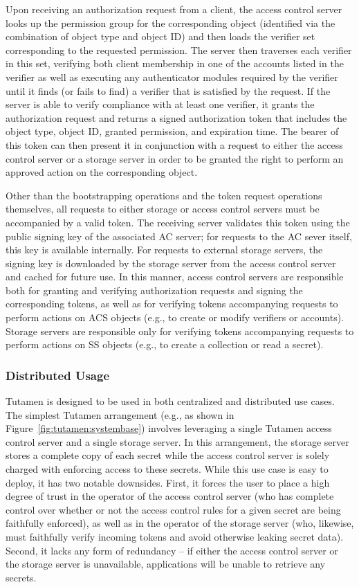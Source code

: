 Upon receiving an authorization request from a client, the access
control server looks up the permission group for the corresponding
object (identified via the combination of object type and object ID)
and then loads the verifier set corresponding to the requested
permission. The server then traverses each verifier in this set,
verifying both client membership in one of the accounts listed in the
verifier as well as executing any authenticator modules required by
the verifier until it finds (or fails to find) a verifier that is
satisfied by the request. If the server is able to verify compliance
with at least one verifier, it grants the authorization request and
returns a signed authorization token that includes the object type,
object ID, granted permission, and expiration time. The bearer of this
token can then present it in conjunction with a request to either the
access control server or a storage server in order to be granted the
right to perform an approved action on the corresponding object.

Other than the bootstrapping operations and the token request
operations themselves, all requests to either storage or access
control servers must be accompanied by a valid token. The receiving
server validates this token using the public signing key of the
associated AC server; for requests to the AC sever itself, this key is
available internally. For requests to external storage servers, the
signing key is downloaded by the storage server from the access
control server and cached for future use. In this manner, access
control servers are responsible both for granting and verifying
authorization requests and signing the corresponding tokens, as well
as for verifying tokens accompanying requests to perform actions on
ACS objects (e.g., to create or modify verifiers or accounts). Storage
servers are responsible only for verifying tokens accompanying
requests to perform actions on SS objects (e.g., to create a collection
or read a secret).

\subsubsection{Distributed Usage}
\label{sec:tutamen:arch:distributed}

Tutamen is designed to be used in both centralized and distributed use
cases. The simplest Tutamen arrangement (e.g., as shown in
Figure~\ref{fig:tutamen:systembase}) involves leveraging a single
Tutamen access control server and a single storage server. In this
arrangement, the storage server stores a complete copy of each secret
while the access control server is solely charged with enforcing
access to these secrets. While this use case is easy to deploy, it has
two notable downsides. First, it forces the user to place a high
degree of trust in the operator of the access control server (who has
complete control over whether or not the access control rules for a
given secret are being faithfully enforced), as well as in the
operator of the storage server (who, likewise, must faithfully verify
incoming tokens and avoid otherwise leaking secret data). Second, it
lacks any form of redundancy -- if either the access control server or
the storage server is unavailable, applications will be unable to
retrieve any secrets.

